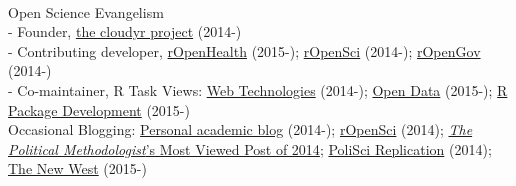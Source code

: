 \documentclass[12pt]{article}
\newcommand{\topic}[1]{\pagebreak[3]\indent {\color{lg}{\footnotesize #1 }}\\}
\newcommand{\entry}[1]{\indent {\color{lg}\guillemotright}\hspace{2pt}#1\vspace{.25em}\\}
\newcommand{\subentry}[1]{{\color{lg}-} #1\vspace{.25em}\\}
\begin{document}
\topic{Public Engagement}
\entry{Open Science Evangelism}
\subentry{Founder, \href{http://cloudyr.github.io/}{the cloudyr project} (2014-)}
\subentry{Contributing developer, \href{http://ropensci.org/}{rOpenHealth} (2015-); \href{http://ropensci.org/}{rOpenSci} (2014-); \href{http://ropengov.github.io/}{rOpenGov} (2014-)}
\subentry{Co-maintainer, R Task Views:  \href{http://cran.r-project.org/web/views/WebTechnologies.html}{Web Technologies} (2014-); \href{https://www.github.com/ropensci/opendata}{Open Data} (2015-); \href{https://www.github.com/leeper/PackageDevelopment}{R Package Development} (2015-)}
\entry{Occasional Blogging: \href{http://thomasleeper.com/blog}{Personal academic blog} (2014-); \href{http://ropensci.org/blog/}{rOpenSci} (2014); \href{http://thepoliticalmethodologist.com/2015/01/05/introducing-the-annual-tpm-most-viewed-post-award-and-our-2014-winner/}{\textit{The Political Methodologist}'s Most Viewed Post of 2014}; \href{http://politicalsciencereplication.wordpress.com/}{PoliSci Replication} (2014); \href{https://thewpsa.wordpress.com/2015/05/09/what-can-we-learn-from-10-1-million-facebook-users-its-complicated/}{The New West} (2015-)}
\end{document}
